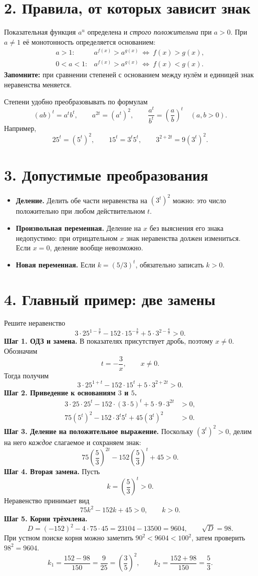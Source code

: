 \documentclass[a4paper,12pt]{article}
\newcommand{\idea}[1]{\textcolor{darkaccent}{\textbf{#1}}}
\newcommand{\sect}[1]{\section*{\color{darkaccent}#1}}
\begin{document}
\sect{2. Правила, от которых зависит знак}
Показательная функция $a^u$ определена и \emph{строго положительна} при $a>0$. При $a\ne1$ её монотонность определяется основанием:
\[
\begin{array}{ll}
 a>1: & a^{f(x)}>a^{g(x)}\ \Longleftrightarrow\ f(x)>g(x),\\[4pt]
 0<a<1: & a^{f(x)}>a^{g(x)}\ \Longleftrightarrow\ f(x)<g(x).
\end{array}
\]
\idea{Запомните:} при сравнении степеней с основанием между нулём и единицей знак неравенства меняется.

Степени удобно преобразовывать по формулам
\[
 (ab)^t=a^t b^t,\qquad a^{2t}=(a^t)^2,\qquad
 \frac{a^t}{b^t}=\left(\frac ab\right)^t\quad(a,b>0).
\]
Например,
\[
 25^t=(5^t)^2,\qquad 15^t=3^t5^t,\qquad
 3^{2+2t}=9(3^t)^2.
\]

\sect{3. Допустимые преобразования}
\begin{itemize}[label=\textcolor{accent}{\textbullet},leftmargin=7mm]
\item \textbf{Деление.} Делить обе части неравенства на $(3^t)^2$ можно: это число положительно при любом действительном $t$.
\item \textbf{Произвольная переменная.} Деление на $x$ без выяснения его знака недопустимо: при отрицательном $x$ знак неравенства должен измениться. Если $x=0$, деление вообще невозможно.
\item \textbf{Новая переменная.} Если $k=(5/3)^t$, обязательно записать $k>0$.
\end{itemize}
\clearpage

\sect{4. Главный пример: две замены}
Решите неравенство
\begin{equation}\label{eq:main}
 3\cdot25^{1-\frac3x}-152\cdot15^{-\frac3x}
 +5\cdot3^{2-\frac6x}>0.
\end{equation}
\textbf{Шаг 1. ОДЗ и замена.} В показателях присутствует дробь, поэтому $x\ne0$. Обозначим
\[
 t=-\frac3x,\qquad x\ne0.
\]
Тогда получим
\[
 3\cdot25^{1+t}-152\cdot15^t+5\cdot3^{2+2t}>0.
\]
\textbf{Шаг 2. Приведение к основаниям $3$ и $5$.}
\begin{align*}
 3\cdot25\cdot25^t-152\cdot(3\cdot5)^t
    +5\cdot9\cdot3^{2t}&>0,\\
 75(5^t)^2-152\cdot3^t5^t+45(3^t)^2&>0.
\end{align*}
\textbf{Шаг 3. Деление на положительное выражение.}
Поскольку $(3^t)^2>0$, делим на него \emph{каждое} слагаемое и сохраняем знак:
\[
 75\left(\frac53\right)^{2t}
 -152\left(\frac53\right)^t+45>0.
\]
\textbf{Шаг 4. Вторая замена.} Пусть
\[
 k=\left(\frac53\right)^t>0.
\]
Неравенство принимает вид
\begin{equation}\label{eq:quad}
 75k^2-152k+45>0,\qquad k>0.
\end{equation}
\textbf{Шаг 5. Корни трёхчлена.}
\[
 D=(-152)^2-4\cdot75\cdot45=23104-13500=9604,
 \qquad\sqrt D=98.
\]
При устном поиске корня можно заметить $90^2<9604<100^2$, затем проверить $98^2=9604$.
\[
 k_1=\frac{152-98}{150}=\frac9{25}=\left(\frac35\right)^2,
 \qquad k_2=\frac{152+98}{150}=\frac53.
\]
\clearpage
\end{document}
